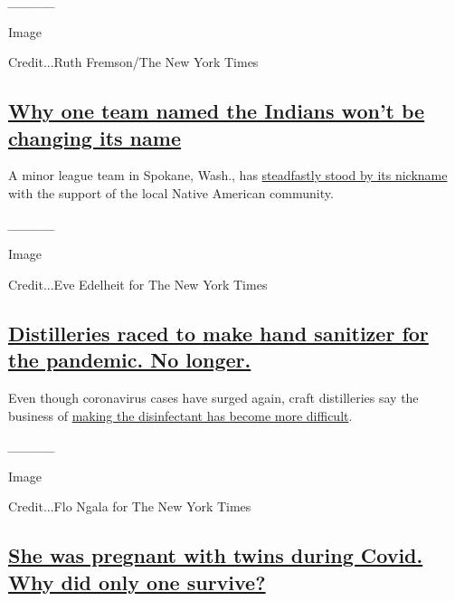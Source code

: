 \emph{\_\_\_\_\_}

Image

Credit...Ruth Fremson/The New York Times

\hypertarget{why-one-team-named-the-indians-wont-be-changing-its-name}{%
\subsection{\texorpdfstring{\href{https://www.nytimes.com/2020/08/03/sports/baseball/indians-team-names-mascots.html}{Why
one team named the Indians won't be changing its
name}}{Why one team named the Indians won't be changing its name}}\label{why-one-team-named-the-indians-wont-be-changing-its-name}}

A minor league team in Spokane, Wash., has
\href{https://www.nytimes.com/2020/08/03/sports/baseball/indians-team-names-mascots.html}{steadfastly
stood by its nickname} with the support of the local Native American
community.

\emph{\_\_\_\_\_}

Image

Credit...Eve Edelheit for The New York Times

\hypertarget{distilleries-raced-to-make-hand-sanitizer-for-the-pandemic-no-longer}{%
\subsection{\texorpdfstring{\href{https://www.nytimes.com/2020/08/04/business/distilleries-hand-sanitizer-pandemic.html}{Distilleries
raced to make hand sanitizer for the pandemic. No
longer.}}{Distilleries raced to make hand sanitizer for the pandemic. No longer.}}\label{distilleries-raced-to-make-hand-sanitizer-for-the-pandemic-no-longer}}

Even though coronavirus cases have surged again, craft distilleries say
the business of
\href{https://www.nytimes.com/2020/08/04/business/distilleries-hand-sanitizer-pandemic.html}{making
the disinfectant has become more difficult}.

\emph{\_\_\_\_\_}

Image

Credit...Flo Ngala for The New York Times

\hypertarget{she-was-pregnant-with-twins-during-covid-why-did-only-one-survive}{%
\subsection{\texorpdfstring{\href{https://www.nytimes.com/2020/08/06/nyregion/childbirth-Covid-Black-mothers.html}{She
was pregnant with twins during Covid. Why did only one
survive?}}{She was pregnant with twins during Covid. Why did only one survive?}}\label{she-was-pregnant-with-twins-during-covid-why-did-only-one-survive}}

